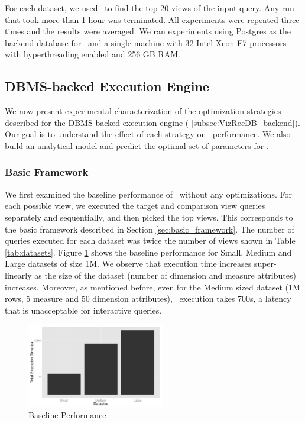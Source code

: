 For each dataset, we used \VizRecDB\ to find the top 20 views of the input query.
Any run that took more than 1 hour was terminated. All experiments were repeated
three times and the results were averaged.
We ran experiments using Postgres as the backend database for \VizRecDB\ and a single
machine with 32 Intel Xeon E7 processors with hyperthreading enabled and 256 GB
RAM.

\subsection{DBMS-backed Execution Engine}

We now present experimental characterization of the optimization
strategies described for the DBMS-backed execution engine (
\ref{subsec:VizRecDB_backend}).
Our goal is to understand the effect of each strategy on \VizRecDB\ performance. We
also build an analytical model and predict the optimal set of
parameters for \VizRecDB.

\subsubsection{Basic Framework}
We first examined the baseline performance of \VizRecDB\ without any optimizations.
For each possible view, we executed the target and comparison view queries
separately and sequentially, and then picked the top views. This corresponds to
the basic framework described in Section \ref{sec:basic_framework}. The number
of queries executed for each dataset was twice the number of views shown in
Table \ref{tab:datasets}. Figure \ref{fig:baseline_performance} shows the baseline
performance for Small, Medium and Large datasets of size 1M. We observe that
execution time increases super-linearly as the size of the dataset (number of dimension and
measure attributes) increases. Moreover, as mentioned before, even for the
Medium sized dataset (1M rows, 5 measure and 50 dimension attributes), \VizRecDB\
execution takes 700s, a latency that is unacceptable for interactive queries.

\begin{figure}[h]
  \centering
    \includegraphics[width=6cm]{Images/baseline_performance.pdf}
    \caption{Baseline Performance} 
      \label{fig:baseline_performance}
\end{figure}

